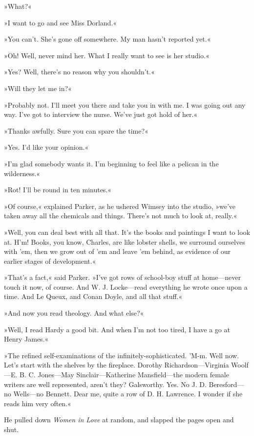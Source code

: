 »What?«

»I want to go and see Miss Dorland.«

»You can't. She's gone off somewhere. My man hasn't reported yet.«

»Oh! Well, never mind her. What I really want to see is her studio.«

»Yes? Well, there's no reason why you shouldn't.«

»Will they let me in?«

»Probably not. I'll meet you there and take you in with me. I was going out any way. I've got to interview the nurse. We've just got hold of her.«

»Thanks awfully. Sure you can spare the time?«

»Yes. I'd like your opinion.«

»I'm glad somebody wants it. I'm beginning to feel like a pelican in the wilderness.«

»Rot! I'll be round in ten minutes.«

»Of course,« explained Parker, as he ushered Wimsey into the studio, »we've taken away all the chemicals and things. There's not much to look at, really.«

»Well, you can deal best with all that. It's the books and paintings I want to look at. H'm! Books, you know, Charles, are like lobster shells, we surround ourselves with 'em, then we grow out of 'em and leave 'em behind, as evidence of our earlier stages of development.«

»That's a fact,« said Parker. »I've got rows of school-boy stuff at home—never touch it now, of course. And W\@. J\@. Locke—read everything he wrote once upon a time. And Le Queux, and Conan Doyle, and all that stuff.«

»And now you read theology. And what else?«

»Well, I read Hardy a good bit. And when I'm not too tired, I have a go at Henry James.«

»The refined self-examinations of the infinitely-sophisticated. 'M-m. Well now. Let's start with the shelves by the fireplace. Dorothy Richardson—Virginia Woolf—E\@. B\@. C\@. Jones—May Sinclair—Katherine Mansfield—the modern female writers are well represented, aren't they? Galsworthy. Yes. No J\@. D\@. Beresford—no Wells—no Bennett. Dear me, quite a row of D\@. H\@. Lawrence. I wonder if she reads him very often.«

He pulled down \textit{Women in Love} at random, and slapped the pages open and shut.

